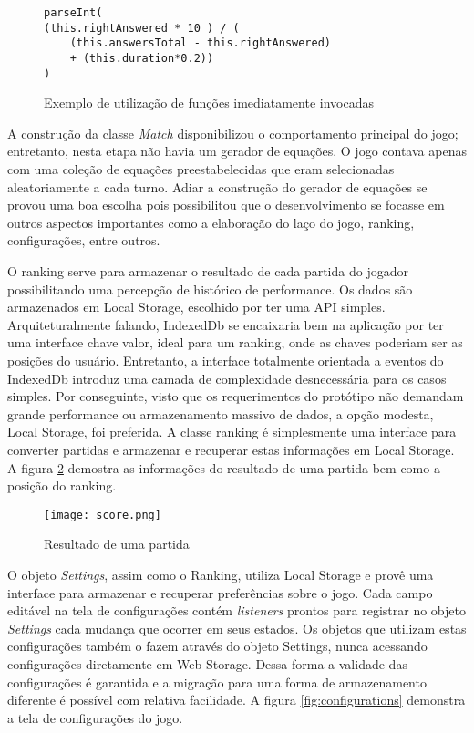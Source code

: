 \begin{figure}[H]
\centering
\begin{verbatim}
parseInt(
(this.rightAnswered * 10 ) / (
    (this.answersTotal - this.rightAnswered) 
    + (this.duration*0.2))
)
\end{verbatim}
\caption{Exemplo de utilização de funções imediatamente invocadas}
\label{fig:punctuationCalculation}
\end{figure}


A construção da classe \textit{Match} disponibilizou o comportamento
principal do jogo; entretanto, nesta etapa não havia um gerador de
equações. O jogo contava apenas com uma coleção de equações
preestabelecidas que eram selecionadas aleatoriamente a cada turno.
Adiar a construção do gerador de equações se provou uma boa
escolha pois possibilitou que o desenvolvimento se focasse em outros
aspectos importantes como a elaboração do laço do jogo, ranking,
configurações, entre outros.

O ranking serve para armazenar o resultado de cada partida do jogador
possibilitando uma percepção de histórico de performance. Os
dados são armazenados em Local Storage, escolhido por ter uma API
simples. Arquiteturalmente falando, IndexedDb se encaixaria bem na
aplicação por ter uma interface chave valor, ideal para um ranking,
onde as chaves poderiam ser as posições do usuário. Entretanto, a
interface totalmente orientada a eventos do IndexedDb introduz uma
camada de complexidade desnecessária para os casos simples. Por
conseguinte, visto que os requerimentos do protótipo não demandam
grande performance ou armazenamento massivo de dados, a opção
modesta, Local Storage, foi preferida. A classe ranking é simplesmente
uma interface para converter partidas e armazenar e recuperar estas
informações em Local Storage. A figura \ref{fig:placar} demostra
as informações do resultado de uma partida bem como a posição do
ranking.

\begin{figure}[H]
    \centering
    \texttt{[image: score.png]}
	\caption{Resultado de uma partida}
    \label{fig:placar}
\end{figure}

O objeto \textit{Settings}, assim como o Ranking, utiliza Local Storage
e provê uma interface para armazenar e recuperar preferências sobre
o jogo. Cada campo editável na tela de configurações contém
\textit{listeners} prontos para registrar no objeto \textit{Settings}
cada mudança que ocorrer em seus estados. Os objetos que utilizam estas
configurações também o fazem através do objeto Settings, nunca
acessando configurações diretamente em Web Storage. Dessa forma a
validade das configurações é garantida e a migração para uma forma
de armazenamento diferente é possível com relativa facilidade.
A figura \ref{fig:configurations} demonstra a tela de configurações do 
jogo.

